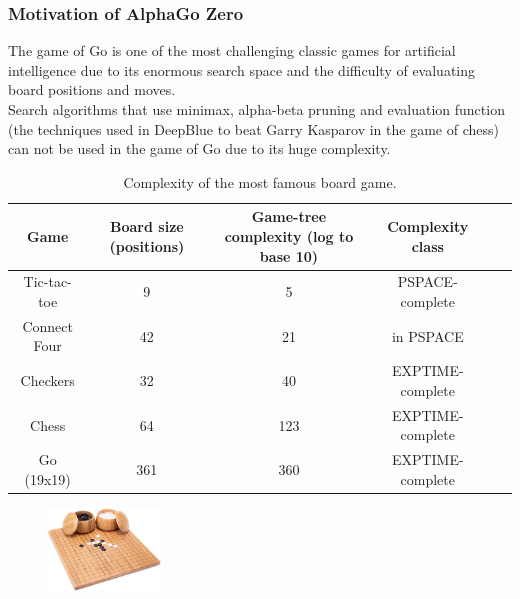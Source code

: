 \documentclass[9pt]{beamer}
\begin{document}
\begin{frame}
	\frametitle{Motivation of AlphaGo Zero}
	The game of Go is one of the most challenging classic games for artificial intelligence due to its enormous search space and the difficulty of evaluating board positions and moves.\\

	Search algorithms that use minimax, alpha-beta pruning and evaluation function (the techniques used in DeepBlue\cite{CAMPBELL200257} to beat Garry Kasparov in the game of chess) can not be used in the game of Go due to its huge complexity.

	\begin{table}

		\tiny
		\centering
		
		\begin{tabular}{|cccccc|}

		\hline
		Game  &
		Board size (positions)  &
		Game-tree complexity (log to base 10)  &
		Complexity class\\
		\hline
		\hline
		Tic-tac-toe	& 9  & 5 & PSPACE-complete\cite{Reisch1981HexIP} \\
		Connect Four & 42 & 21 & in PSPACE \cite{Allis1994SearchingFS} \\
		Checkers & 32  & 40   & EXPTIME-complete \cite{Robson1984NBN} \\
		Chess & 64 & 123  & EXPTIME-complete \cite{FRAENKEL1981199} \\
		Go (19x19) & 361 & 360 & EXPTIME-complete \cite{inproceedings} \\
		\hline
		\end{tabular}
		\caption{Complexity of the most famous board game.}
		\label{tab:game-complexity}
		
	\end{table}

	
	\begin{figure}[h]
		\centering
		\includegraphics[width=3cm]{go-board.jpg}
	\end{figure}


\end{frame}

\end{document}
